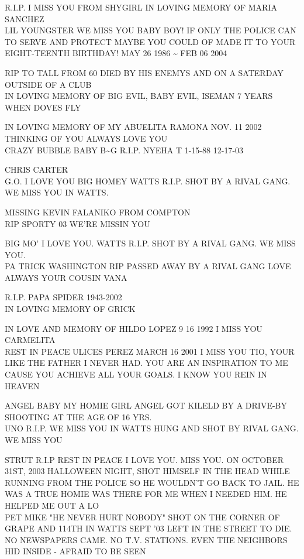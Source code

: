 \documentclass[10pt,letterpaper]{article}
\begin{document}
R.I.P. I MISS YOU FROM SHYGIRL IN LOVING MEMORY OF MARIA SANCHEZ\\
LIL YOUNGSTER WE MISS YOU BABY BOY!  IF ONLY THE POLICE CAN TO SERVE AND PROTECT MAYBE YOU COULD OF MADE IT TO YOUR EIGHT{-}TEENTH BIRTHDAY!  MAY 26 1986 \textasciitilde{} FEB 06 2004

RIP TO TALL FROM 60 DIED BY HIS ENEMYS AND ON A SATERDAY OUTSIDE OF A CLUB\\
IN LOVING MEMORY OF BIG EVIL, BABY EVIL, ISEMAN 7 YEARS WHEN DOVES FLY

IN LOVING MEMORY OF MY ABUELITA RAMONA NOV. 11 2002 THINKING OF YOU ALWAYS LOVE YOU\\
CRAZY BUBBLE BABY B\textasciitilde{}G R.I.P. NYEHA T 1{-}15{-}88 12{-}17{-}03

CHRIS CARTER\\
G.O. I LOVE YOU BIG HOMEY WATTS R.I.P.  SHOT BY A RIVAL GANG.  WE MISS YOU IN WATTS.

MISSING KEVIN FALANIKO FROM COMPTON\\
RIP SPORTY 03 WE'RE MISSIN YOU

BIG MO' I LOVE YOU. WATTS R.I.P. SHOT BY A RIVAL GANG.  WE MISS YOU.\\
PA TRICK WASHINGTON RIP PASSED AWAY BY A RIVAL GANG LOVE ALWAYS YOUR COUSIN VANA

R.I.P. PAPA SPIDER 1943{-}2002\\
IN LOVING MEMORY OF GRICK

IN LOVE AND MEMORY OF HILDO LOPEZ 9 16 1992 I MISS YOU CARMELITA\\
REST IN PEACE ULICES PEREZ MARCH 16 2001 I MISS YOU TIO, YOUR LIKE THE FATHER I NEVER HAD.  YOU ARE AN INSPIRATION TO ME CAUSE YOU ACHIEVE ALL YOUR GOALS.  I KNOW YOU REIN IN HEAVEN

ANGEL BABY MY HOMIE GIRL ANGEL GOT KILELD BY A DRIVE{-}BY SHOOTING AT THE AGE OF 16 YRS.\\
UNO R.I.P.  WE MISS YOU IN WATTS HUNG AND SHOT BY RIVAL GANG.  WE MISS YOU

STRUT R.I.P REST IN PEACE I LOVE YOU.  MISS YOU.  ON OCTOBER 31ST, 2003 HALLOWEEN NIGHT, SHOT HIMSELF IN THE HEAD WHILE RUNNING FROM THE POLICE SO HE WOULDN'T GO BACK TO JAIL.  HE WAS A TRUE HOMIE WAS THERE FOR ME WHEN I NEEDED HIM.  HE HELPED ME OUT A LO\\
PET MIKE "HE NEVER HURT NOBODY" SHOT ON THE CORNER OF GRAPE AND 114TH IN WATTS SEPT '03 LEFT IN THE STREET TO DIE.  NO NEWSPAPERS CAME.  NO T.V. STATIONS.  EVEN THE NEIGHBORS HID INSIDE {-} AFRAID TO BE SEEN
\end{document}
